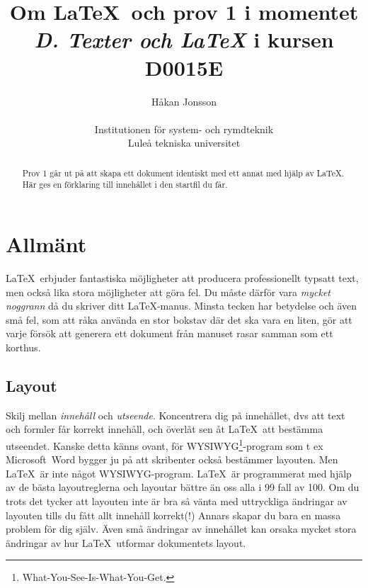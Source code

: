 \documentclass[a4paper,12pt]{article}
\title{Om \LaTeX\ och prov 1 i momentet \\ \emph{D. Texter och \LaTeX}
  i kursen D0015E}
\author{H{\aa}kan Jonsson\\ ~\\ Institutionen för system- och
  rymdteknik \\ Luleå tekniska universitet}
\begin{document}
\maketitle

\begin{abstract}
  Prov 1 går ut på att skapa ett dokument identiskt med ett annat med
  hjälp av \LaTeX. Här ges en förklaring till innehållet i den startfil
  du får. 
\end{abstract}

\section{Allmänt}

\LaTeX\ erbjuder fantastiska möjligheter att producera professionellt
typsatt text, men också lika stora möjligheter att göra fel. Du måste
därför vara \emph{mycket noggrann} då du skriver ditt
\LaTeX-manus. Minsta tecken har betydelse och även små fel, som att
råka använda en stor bokstav där det ska vara en liten, gör att varje
försök att generera ett dokument från manuset rasar samman som ett
korthus. 
\begin{center}
  \noindent
\end{center}

\subsection{Layout}

Skilj mellan \emph{innehåll} och \emph{utseende}. Koncentrera dig på
innehållet, dvs att text och formler får korrekt innehåll, och överlåt
sen åt \LaTeX\ att bestämma utseendet. Kanske detta känns ovant, för
WYSIWYG\footnote{What-You-See-Is-What-You-Get.}-program som t ex
Microsoft~Word bygger ju på att skribenter också bestämmer
layouten. Men \LaTeX\ är inte något WYSIWYG-program. \LaTeX\ är
programmerat med hjälp av de bästa layoutreglerna och layoutar bättre
än oss alla i 99 fall av 100. Om du trots det tycker att layouten inte
är bra så vänta med uttryckliga ändringar av layouten tills du fått
allt innehåll korrekt(!) Annars skapar du bara en massa problem för
dig själv. Även små ändringar av innehållet kan orsaka mycket stora
ändringar av hur \LaTeX\ utformar dokumentets layout. 
\end{document}
